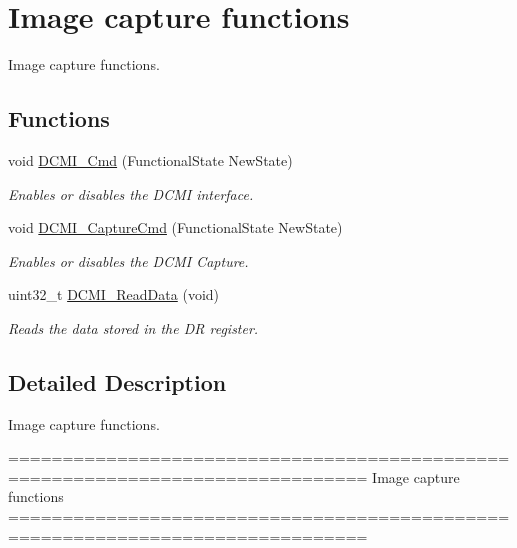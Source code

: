 \hypertarget{group___d_c_m_i___group2}{}\section{Image capture functions}
\label{group___d_c_m_i___group2}


Image capture functions.  


\subsection*{Functions}
\begin{DoxyCompactItemize}
\item 
void \hyperlink{group___d_c_m_i___group2_ga36bba54c40637b8071aea8ffea71fb84}{D\+C\+M\+I\+\_\+\+Cmd} (Functional\+State New\+State)
\begin{DoxyCompactList}\small\item\em Enables or disables the D\+C\+M\+I interface. \end{DoxyCompactList}\item 
void \hyperlink{group___d_c_m_i___group2_gad00fb33497ffa337a5b2b77fc6aa8d74}{D\+C\+M\+I\+\_\+\+Capture\+Cmd} (Functional\+State New\+State)
\begin{DoxyCompactList}\small\item\em Enables or disables the D\+C\+M\+I Capture. \end{DoxyCompactList}\item 
uint32\+\_\+t \hyperlink{group___d_c_m_i___group2_ga475305bd8694e4cebefcb263c0a5b979}{D\+C\+M\+I\+\_\+\+Read\+Data} (void)
\begin{DoxyCompactList}\small\item\em Reads the data stored in the D\+R register. \end{DoxyCompactList}\end{DoxyCompactItemize}


\subsection{Detailed Description}
Image capture functions. 

\begin{DoxyVerb} ===============================================================================
                                 Image capture functions
 ===============================================================================  \end{DoxyVerb}
 

